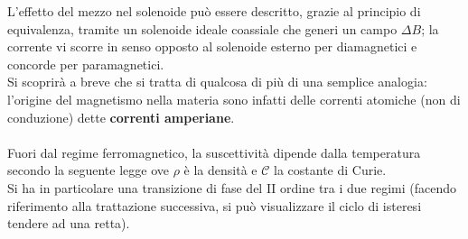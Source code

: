 L'effetto del mezzo nel solenoide può essere descritto, grazie al principio di equivalenza, tramite un solenoide ideale coassiale che generi un campo $\Delta B$; la corrente vi scorre in senso opposto al solenoide esterno per diamagnetici e concorde per paramagnetici. 
\\Si scoprirà a breve che si tratta di qualcosa di più di una semplice analogia: l'origine del magnetismo nella materia sono infatti delle correnti atomiche (non di conduzione) dette \textbf{correnti amperiane}.
\\~\\
Fuori dal regime ferromagnetico, la suscettività dipende dalla temperatura secondo la seguente legge
ove $\rho$ è la densità e $\mathcal{C}$ la costante di Curie.
\\Si ha in particolare una transizione di fase del II ordine tra i due regimi (facendo riferimento alla trattazione successiva, si può visualizzare il ciclo di isteresi tendere ad una retta).

